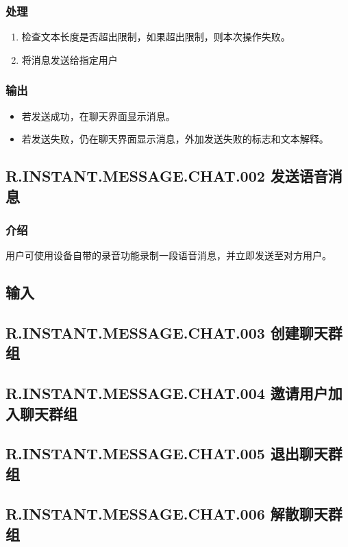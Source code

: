 \subsubsection{处理}

\begin{enumerate}
	\item 检查文本长度是否超出限制，如果超出限制，则本次操作失败。
	\item 将消息发送给指定用户

	\end{enumerate}

\subsubsection{输出}

\begin{itemize}
	\item 若发送成功，在聊天界面显示消息。
	\item 若发送失败，仍在聊天界面显示消息，外加发送失败的标志和文本解释。
	\end{itemize}
	
\subsection{R.INSTANT.MESSAGE.CHAT.002 发送语音消息}
\subsubsection{介绍}
用户可使用设备自带的录音功能录制一段语音消息，并立即发送至对方用户。
\subsection{输入}

\subsection{R.INSTANT.MESSAGE.CHAT.003 创建聊天群组}
\subsection{R.INSTANT.MESSAGE.CHAT.004 邀请用户加入聊天群组}
\subsection{R.INSTANT.MESSAGE.CHAT.005 退出聊天群组}
\subsection{R.INSTANT.MESSAGE.CHAT.006 解散聊天群组}

